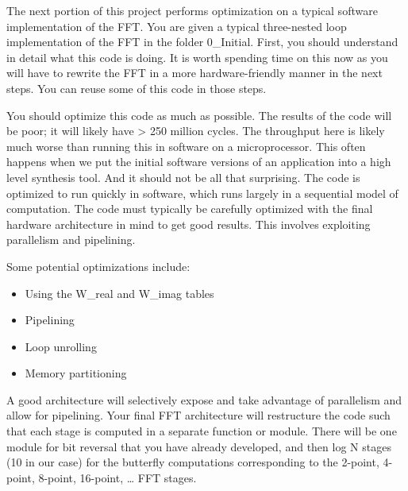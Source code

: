 \documentclass[a4paper,12pt,twoside]{article}
\begin{document}
The next portion of this project performs optimization on a typical software implementation of the FFT. You are given a typical three-nested loop implementation of the FFT in the folder 0\_Initial. First, you should understand in detail what this code is doing. It is worth spending time on this now as you will have to rewrite the FFT in a more hardware-friendly manner in the next steps. You can reuse some of this code in those steps.

You should optimize this code as much as possible. The results of the code will be poor; it will likely have > 250 million cycles. The throughput here is likely much worse than running this in software on a microprocessor. This often happens when we put the initial software versions of an application into a high level synthesis tool. And it should not be all that surprising. The code is optimized to run quickly in software, which runs largely in a sequential model of computation. The code must typically be carefully optimized with the final hardware architecture in mind to get good results. This involves exploiting parallelism and pipelining.

Some potential optimizations include:
\begin{itemize}
    \item Using the W\_real and W\_imag tables
    \item Pipelining
    \item Loop unrolling
    \item Memory partitioning
\end{itemize}
A good architecture will selectively expose and take advantage of parallelism and allow for pipelining. Your final FFT architecture will restructure the code such that each stage is computed in a separate function or module. There will be one module for bit reversal that you have already developed, and then log N stages (10 in our case) for the butterfly computations corresponding to the 2-point, 4-point, 8-point, 16-point, … FFT stages.
\end{document}

